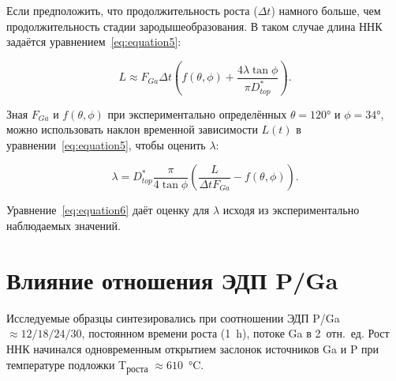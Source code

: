 Если предположить, что продолжительность роста (\(\Delta t\)) намного больше,
чем продолжительность стадии зародышеобразования. В таком случае длина ННК задаётся
уравнением~\ref{eq:equation5}:

\begin{equation} \label{eq:equation5} L\approx F_{Ga} \Delta t \left(
	f(\theta,\phi) + \frac{4 \lambda \tan{\phi}}{\pi D_{top}^\ast} \right).
\end{equation}

Зная \(F_ {Ga}\) и \(f(\theta,\phi)\) при экспериментально определённых
\(\theta = 120\si{\degree}\) и \(\phi = 34\si{\degree}\), можно использовать
наклон временной зависимости \(L(t)\) в уравнении~\ref{eq:equation5}, чтобы
оценить \(\lambda\):

\begin{equation} \label{eq:equation6} \lambda=D_{top}^\ast
	\frac{\pi}{4\tan{\phi}} \left( \frac{L}{\Delta t F_{Ga}}-f(\theta,\phi)
\right).  \end{equation}

Уравнение~\ref{eq:equation6} даёт оценку для \(\lambda\) исходя из
экспериментально наблюдаемых значений.

\section{Влияние отношения ЭДП P/Ga}\label{sec:ch5/sec4}


Исследуемые образцы синтезировались при соотношении ЭДП P/Ga \(\approx
12/18/24/30\), постоянном времени роста (1~\si{\hour}), потоке Ga в 2~отн.~ед.
Рост ННК начинался одновременным открытием заслонок источников Ga и P при
температуре подложки T\textsubscript{роста} \(\approx
610\)~\si{\degreeCelsius}.

